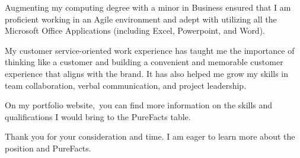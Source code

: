 \documentclass[11pt, a4paper]{awesome-cv} %
\begin{document}
\begin{cvletter}
Augmenting my computing degree with a minor in Business ensured that I am proficient working in an Agile
environment and adept with utilizing all the Microsoft Office Applications (including Excel, Powerpoint, and
Word).

My customer service-oriented work experience has taught me the importance of thinking like a customer and
building a convenient and memorable customer experience that aligns with the brand. It has also helped me
grow my skills in team collaboration, verbal communication, and project leadership.

On my portfolio website, you can find more information on the skills and
qualifications I would bring to the PureFacts table.


Thank you for your consideration and time. I am eager to learn more about the position
and PureFacts.


\end{cvletter}


\makeletterclosing %
\end{document}

